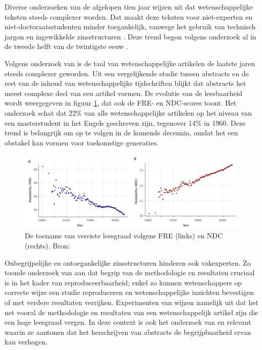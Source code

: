 Diverse onderzoeken van de afgelopen tien jaar wijzen uit dat wetenschappelijke teksten steeds complexer worden. Dat maakt deze teksten voor niet-experten en niet-doctoraatsstudenten minder toegankelijk, vanwege het gebruik van technisch jargon en ingewikkelde zinsstructuren \autocite{Ball2017, PlavenSigray2017, Jones2019}. Deze trend begon volgens onderzoek al in de tweede helft van de twintigste eeuw \autocite{Hayes1992}.

\medspace

Volgens onderzoek van \textcite{PlavenSigray2017} is de taal van wetenschappelijke artikelen de laatste jaren steeds complexer geworden. Uit een vergelijkende studie tussen abstracts en de rest van de inhoud van wetenschappelijke tijdschriften blijkt dat abstracts het meest complexe deel van een artikel vormen. De evolutie van de leesbaarheid wordt weergegeven in figuur \ref{img:fre-ndc}, dat ook de FRE- en NDC-scores toont. Het onderzoek schat dat 22\% van alle wetenschappelijke artikelen op het niveau van een masterstudent in het Engels geschreven zijn, tegenover 14\% in 1960. Deze trend is belangrijk om op te volgen in de komende decennia, omdat het een obstakel kan vormen voor toekomstige generaties.

\begin{figure}[H]
	\includegraphics[width=\linewidth]{img/fre-ndc.png}
	\caption{De toename van vereiste leesgraad volgens FRE (links) en NDC (rechts). Bron: \autocite{PlavenSigray2017}}
	\label{img:fre-ndc}
\end{figure}

Onbegrijpelijke en ontoegankelijke zinsstructuren hinderen ook vakexperten. Zo toonde onderzoek van \textcite{McNutt2014} aan dat begrip van de methodologie en resultaten cruciaal is in het kader van reproduceerbaarheid; enkel zo kunnen wetenschappers op correcte wijze een studie reproduceren en wetenschappelijke inzichten bevestigen of met verdere resultaten verrijken. Experimenten van \textcite{Hubbard2017} wijzen namelijk uit dat het net vooral de methodologie en resultaten van een wetenschappelijk artikel zijn die een hoge leesgraad vergen. In deze context is ook het onderzoek van \textcite{Hartley1999} en \textcite{Snow2010} relevant waarin ze aantonen dat het herschrijven van abstracts de begrijpbaarheid ervan kan verhogen.

